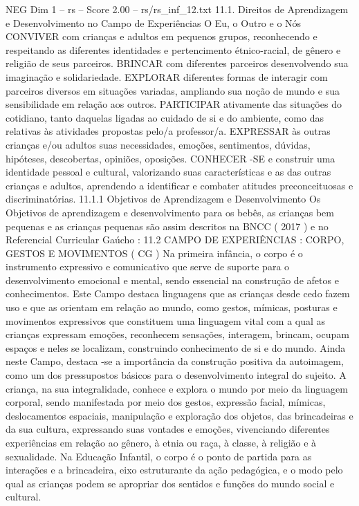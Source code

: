 \begin{textsample}{NEG Dim 1 – rs – Score 2.00 – rs/rs\_inf\_12.txt}  \label{ex:f1_neg_083}
11.1.
Direitos de Aprendizagem e Desenvolvimento no Campo de Experiências O Eu, o Outro e o Nós CONVIVER com crianças e adultos em pequenos grupos, reconhecendo e respeitando as diferentes identidades e pertencimento étnico-racial, de gênero e religião de seus parceiros.
BRINCAR com diferentes parceiros desenvolvendo sua imaginação e solidariedade.
EXPLORAR diferentes formas de interagir com parceiros diversos em situações variadas, ampliando sua noção de mundo e sua sensibilidade em relação aos outros.
PARTICIPAR ativamente das situações do cotidiano, tanto daquelas ligadas ao cuidado de si e do ambiente, como das relativas às atividades propostas pelo/a professor/a.
EXPRESSAR às outras crianças e/ou adultos suas necessidades, emoções, sentimentos, dúvidas, hipóteses, descobertas, opiniões, oposições.
CONHECER -SE e construir uma identidade pessoal e cultural, valorizando suas características e as das outras crianças e adultos, aprendendo a identificar e combater atitudes preconceituosas e discriminatórias. 11.1.1 Objetivos de Aprendizagem e Desenvolvimento Os Objetivos de aprendizagem e desenvolvimento para os bebês, as crianças bem pequenas e as crianças pequenas são assim descritos na BNCC ( 2017 ) e no Referencial Curricular Gaúcho : 11.2 CAMPO DE EXPERIÊNCIAS : CORPO, GESTOS E MOVIMENTOS ( CG ) Na primeira infância, o corpo é o instrumento expressivo e comunicativo que serve de suporte para o desenvolvimento emocional e mental, sendo essencial na construção de afetos e conhecimentos.
Este Campo destaca linguagens que as crianças desde cedo fazem uso e que as orientam em relação ao mundo, como gestos, mímicas, posturas e movimentos expressivos que constituem uma linguagem vital com a qual as crianças expressam emoções, reconhecem sensações, interagem, brincam, ocupam espaços e neles se localizam, construindo conhecimento de si e do mundo.
Ainda neste Campo, destaca -se a importância da construção positiva da autoimagem, como um dos pressupostos básicos para o desenvolvimento integral do sujeito.
A criança, na sua integralidade, conhece e explora o mundo por meio da linguagem corporal, sendo manifestada por meio dos gestos, expressão facial, mímicas, deslocamentos espaciais, manipulação e exploração dos objetos, das brincadeiras e da sua cultura, expressando suas vontades e emoções, vivenciando diferentes experiências em relação ao gênero, à etnia ou raça, à classe, à religião e à sexualidade.
Na Educação Infantil, o corpo é o ponto de partida para as interações e a brincadeira, eixo estruturante da ação pedagógica, e o modo pelo qual as crianças podem se apropriar dos sentidos e funções do mundo social e cultural.

\end{textsample}
